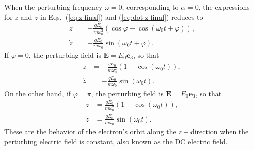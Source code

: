 \documentclass[twocolumn,showpacs,preprintnumbers,amsmath,amssymb]{revtex4}
\begin{document}
When the perturbing frequency $\omega = 0$, corresponding to $\alpha=0$, the expressions for $z$ and $\dot z$ in Eqs.~(\ref{eq:z final}) and (\ref{eq:dot z final}) reduces to
\begin{subequations}
\begin{align}
z &= -\frac{qE_0}{m\omega_0^2}(\cos\varphi - \cos(\omega_0t +\varphi)),\\
\dot z &= -\frac{qE_0}{m\omega_0}\sin(\omega_0t +\varphi).
\end{align}
\end{subequations}
If $\varphi=0$, the perturbing field is $\mathbf E=E_0\mathbf e_3$, so that
\begin{subequations}
\begin{align}
z &= -\frac{qE_0}{m\omega_0^2}(1 - \cos(\omega_0t)),\\
\dot z &= -\frac{qE_0}{m\omega_0}\sin(\omega_0t).
\end{align}
\end{subequations}
On the other hand, if $\varphi=\pi$, the perturbing field is $\mathbf E=E_0\mathbf e_3$, so that
\begin{subequations}
\begin{align}
z &= \frac{qE_0}{m\omega_0^2}(1 + \cos(\omega_0t)),\\
\dot z &= \frac{qE_0}{m\omega_0}\sin(\omega_0t).
\end{align}
\end{subequations}
These are the behavior of the electron's orbit along the $z-$direction when the perturbing electric field is constant, also known as the DC electric field.
\end{document}
